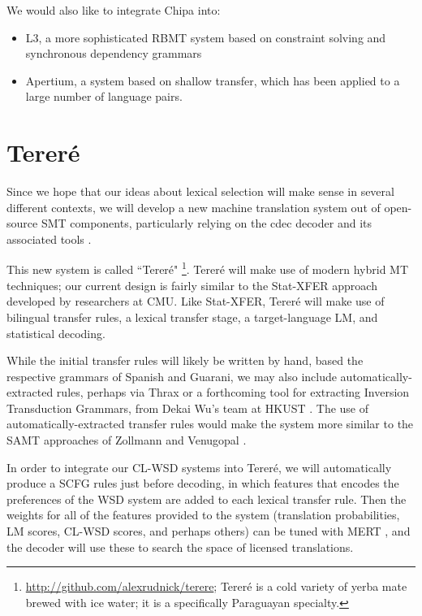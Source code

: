 We would also like to integrate Chipa into:

\begin{itemize}
\item L3, a more sophisticated RBMT system based on constraint solving and
synchronous dependency grammars 
\item Apertium, a system based on shallow transfer, which has been
applied to a large number of language pairs.
\end{itemize}

\section{Tereré}
Since we hope that our ideas about lexical selection will make sense in several
different contexts, we will develop a new machine translation system out of
open-source SMT components, particularly relying on the cdec decoder and its
associated tools \cite{Dyer_etal_2010}.

This new system is called ``Tereré"
\footnote{\url{http://github.com/alexrudnick/terere}; 
Tereré is a cold variety of yerba mate brewed with ice water; it is a
specifically Paraguayan specialty.}.
Tereré will make use of modern hybrid MT techniques; our current design is
fairly similar to the Stat-XFER approach \cite{DBLP:conf/cicling/Lavie08}
developed by researchers at CMU.
Like Stat-XFER, Tereré will make use of bilingual transfer rules, a lexical
transfer stage, a target-language LM, and statistical decoding.

While the initial transfer rules will likely be written by hand, based the
respective grammars of Spanish and Guarani, we may also include
automatically-extracted rules, perhaps via Thrax \cite{weese-EtAl:2011:WMT} or
a forthcoming tool for extracting Inversion Transduction Grammars, from Dekai
Wu's team at HKUST \cite{saers-addanki-wu:2013:HyTra}.
The use of automatically-extracted transfer rules would make the system more
similar to the SAMT approaches of Zollmann and Venugopal
\cite{zollmann-venugopal:2006:WMT}.

In order to integrate our CL-WSD systems into Tereré, we will automatically
produce a SCFG rules just before decoding, in which features that encodes the
preferences of the WSD system are added to each lexical transfer rule. Then
the weights for all of the features provided to the system (translation
probabilities, LM scores, CL-WSD scores, and perhaps others) can be tuned with
MERT \cite{och:2003:ACL}, and the decoder will use these to search the space of
licensed translations.

